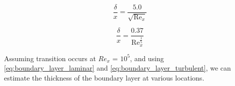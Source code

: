 \begin{equation} \label{eq:boundary_layer_laminar}
    \frac{\delta}{x} = \frac{5.0}{\sqrt{\text{Re}_x}}
\end{equation}

\begin{equation} \label{eq:boundary_layer_turbulent}
    \frac{\delta}{x} = \frac{0.37}{\text{Re}_x^\frac{1}{5}}
\end{equation}

\noindent Assuming transition occurs at $Re_x$ = $10^5$, and using  \autoref{eq:boundary_layer_laminar} and \autoref{eq:boundary_layer_turbulent}, we can estimate the thickness of the boundary layer at various locations.
